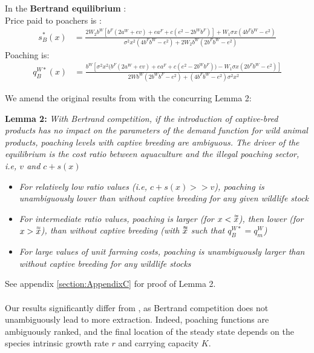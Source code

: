 In the \textbf{Bertrand equilibrium }:\\
Price paid to poachers is : 
\begin{align}
 s_B^*(x) &=\frac{2 W_2 b^W[b^F(2a^W + ev) + e a^F + c(e^2 - 2b^Wb^F)] + W_1 \sigma x (4b^Fb^W - e^2)}{\sigma^2 x^2 (4b^F b^W - e^2) + 2 W_2 b^W(2b^F b^W - e^2)}
\end{align}
Poaching is:
\begin{align}
    q^{W*}_B(x) &= \frac{b^W[\sigma^2 x^2 \big(b^F (2a^W + ev) + ea^F + c(e^2 - 2b^Wb^F)\big) - W_1 \sigma x (2b^F b^W - e^2)]}{2Wb^W (2b^Wb^F - e^2) + (4b^Fb^W - e^2) \sigma^2 x^2}
    \label{eq:poaching_bertrand}
\end{align}

We amend the original results from \cite{damania_economics_2007} with the concurring Lemma 2:
\begin{displayquote}
    \textbf{Lemma 2:} \textit{With Bertrand competition, if the introduction of captive-bred products has no impact on the parameters of the demand function for wild animal products, poaching levels  with captive breeding are ambiguous. The driver of the equilibrium is the cost ratio between aquaculture and the illegal poaching sector, i.e, $v$ and $c +s(x)$}

    \begin{itemize}
        \item \textit{For relatively low ratio values (i.e, $c + s(x) >> v$), poaching is unambiguously lower than without captive breeding for any given wildlife stock}
        \item \textit{For intermediate ratio values, poaching is larger (for $x<\accentset{\approx}{x}$), then lower (for $x>\accentset{\approx}{x}$), than without captive breeding (with $\accentset{\approx}{x}$ such that $q^{W*}_B=q^W_m$)}
        \item \textit{For large values of unit farming costs, poaching is unambiguously larger than without captive breeding for any wildlife stocks}
    \end{itemize}
\end{displayquote}
See appendix \ref{section:AppendixC} for proof of Lemma 2.
\\\\
Our results significantly differ from \cite{damania_economics_2007}, as Bertrand competition does not unambiguously lead to more extraction. Indeed, poaching functions are ambiguously ranked, and the final location of the steady state depends on the species intrinsic growth rate $r$ and carrying capacity $K$.


